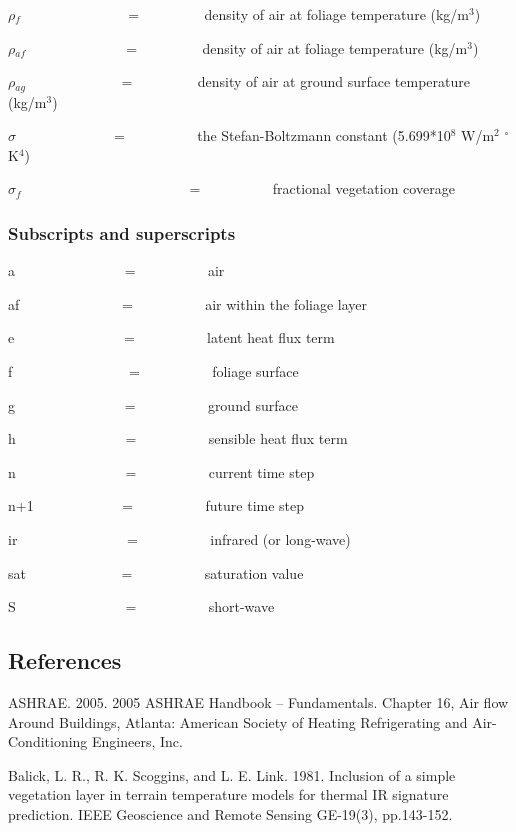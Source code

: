 \(\rho\)\(_{f}\)~ ~~~~~~~~~~~~~ = ~~~~~~~~ density of air at foliage temperature (kg/m\(^{3}\))

\(\rho\)\(_{af}\)~ ~~~~~~~~~~~~ = ~~~~~~~~ density of air at foliage temperature (kg/m\(^{3}\))

\(\rho\)\(_{ag}\)~~~~~~~~~~~~~ = ~~~~~~~~ density of air at ground surface temperature (kg/m\(^{3}\))

\(\sigma\) ~ ~~~~~~~~~~~ = ~~~~~~~~~ the Stefan-Boltzmann constant (5.699*10\(^{8}\) W/m\(^{2}\) $^{\circ}$K\(^{4}\))

\(\sigma\)\(_f\) ~~~~~~~~~~~ ~~~~~~~~~~~ = ~~~~~~~~~ fractional vegetation coverage

\subsubsection{Subscripts and superscripts}\label{subscripts-and-superscripts-000}

a~~~~~~~~~~~~~~~ = ~~~~~~~~~ air

af~~~~~~~~~~~~~~ = ~~~~~~~~~ air within the foliage layer

e~~~~~~~~~~~~~~~ = ~~~~~~~~~ latent heat flux term

f~~~~~~~~~~~~~~~~ = ~~~~~~~~~ foliage surface

g~~~~~~~~~~~~~~~ = ~~~~~~~~~ ground surface

h~~~~~~~~~~~~~~~ = ~~~~~~~~~ sensible heat flux term

n~~~~~~~~~~~~~~~ = ~~~~~~~~~ current time step

n+1~~~~~~~~~~~~ = ~~~~~~~~~ future time step

ir~~~~~~~~~~~~~~~ = ~~~~~~~~~ infrared (or long-wave)

sat~~~~~~~~~~~~~ = ~~~~~~~~~ saturation value

S~~~~~~~~~~~~~~~ = ~~~~~~~~~ short-wave

\subsection{References}\label{references-025}

ASHRAE. 2005. 2005 ASHRAE Handbook -- Fundamentals. Chapter 16, Air flow Around Buildings, Atlanta: American Society of Heating Refrigerating and Air-Conditioning Engineers, Inc.

Balick, L. R., R. K. Scoggins, and L. E. Link. 1981. Inclusion of a simple vegetation layer in terrain temperature models for thermal IR signature prediction. IEEE Geoscience and Remote Sensing GE-19(3), pp.143-152.

